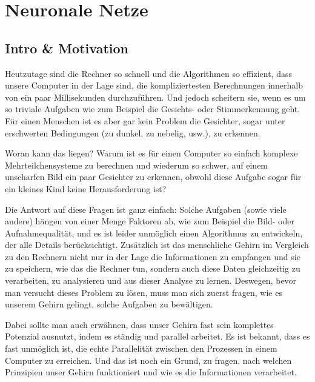 \usetikzlibrary{calc}
\usetikzlibrary{positioning}
\usetikzlibrary{matrix}


\chapter{Neuronale Netze}
\section{Intro \& Motivation}

Heutzutage sind die Rechner so schnell und die Algorithmen so effizient, dass unsere Computer in der Lage sind, die kompliziertesten Berechnungen innerhalb von ein paar Millisekunden durchzuführen. Und jedoch scheitern sie, wenn es um so triviale Aufgaben wie zum Beispiel die Gesichts- oder Stimmerkennung  geht. Für einen Menschen ist es aber gar kein Problem die Gesichter, sogar unter erschwerten Bedingungen (zu dunkel, zu nebelig, usw.), zu erkennen.

Woran kann das liegen? Warum ist es für einen Computer so einfach komplexe Mehrteilchensysteme zu berechnen und wiederum so schwer, auf einem unscharfen Bild ein paar Gesichter zu erkennen, obwohl diese Aufgabe sogar für ein kleines Kind keine Herausforderung ist?

Die Antwort auf diese Fragen ist ganz einfach: Solche Aufgaben (sowie viele andere) hängen von einer Menge Faktoren ab, wie zum Beispiel die Bild- oder Aufnahmequalität, und es ist leider unmöglich einen Algorithmus zu entwickeln, der alle Details berücksichtigt. Zusätzlich ist das menschliche Gehirn im Vergleich zu den Rechnern
nicht nur in der Lage die Informationen zu empfangen und sie zu speichern, wie das die Rechner tun, sondern auch diese Daten gleichzeitig zu verarbeiten, zu analysieren und aus dieser Analyse zu lernen. Deswegen, bevor man versucht dieses Problem zu lösen, muss man sich zuerst fragen, wie es unserem Gehirn gelingt, solche Aufgaben zu bewältigen.

Dabei sollte man auch erwähnen, dass unser Gehirn fast sein komplettes Potenzial ausnutzt, indem es ständig und parallel arbeitet. Es ist bekannt, dass es fast unmöglich ist, die echte Parallelität zwischen den Prozessen in einem Computer zu erreichen. Und das ist noch ein Grund, zu fragen, nach welchen Prinzipien unser Gehirn funktioniert und wie es die Informationen verarbeitet.

